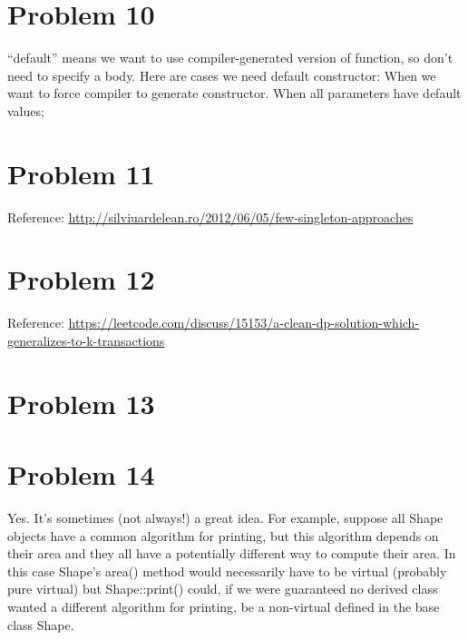 \documentclass[12pt]{amsart}
\begin{document}
\section{Problem 10}
“default” means we want to use compiler-generated version of function, so don’t need to specify a body.
Here are cases we need default constructor:
When we want to force compiler to generate constructor.
When all parameters have default values;




\section{Problem 11}

\begin{framed}

\end{framed}
Reference: \url{http://silviuardelean.ro/2012/06/05/few-singleton-approaches}


\section{Problem 12}

\begin{framed}

\end{framed}


Reference: \url{https://leetcode.com/discuss/15153/a-clean-dp-solution-which-generalizes-to-k-transactions}



\section{Problem 13}

\begin{framed}

\end{framed}


\section{Problem 14}
Yes. It’s sometimes (not always!) a great idea. For example, suppose all Shape objects have a common algorithm for printing, but this algorithm depends on their area and they all have a potentially different way to compute their area. In this case Shape’s area() method would necessarily have to be virtual (probably pure virtual) but Shape::print() could, if we were guaranteed no derived class wanted a different algorithm for printing, be a non-virtual defined in the base class Shape.
\end{document}
